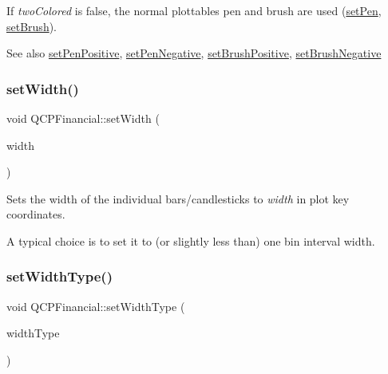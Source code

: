 If {\itshape two\+Colored} is false, the normal plottable\textquotesingle{}s pen and brush are used (\hyperlink{class_q_c_p_abstract_plottable_ab74b09ae4c0e7e13142fe4b5bf46cac7}{set\+Pen}, \hyperlink{class_q_c_p_abstract_plottable_a7a4b92144dca6453a1f0f210e27edc74}{set\+Brush}).

\begin{DoxySeeAlso}{See also}
\hyperlink{class_q_c_p_financial_ac58aa3adc7a35aab0088764b840683e5}{set\+Pen\+Positive}, \hyperlink{class_q_c_p_financial_afe5c07e94ccea01a75b3a2476993c346}{set\+Pen\+Negative}, \hyperlink{class_q_c_p_financial_a5ebff2b1764efd07cc44942e67821829}{set\+Brush\+Positive}, \hyperlink{class_q_c_p_financial_a8bbdd87629f9144b3ef51af660c0961a}{set\+Brush\+Negative} 
\end{DoxySeeAlso}
\mbox{\label{class_q_c_p_financial_a99633f8bac86a61d534ae5eeb1a3068f}} 
\subsubsection{\texorpdfstring{set\+Width()}{setWidth()}}
{\footnotesize\ttfamily void Q\+C\+P\+Financial\+::set\+Width (\begin{DoxyParamCaption}\item[{double}]{width }\end{DoxyParamCaption})}

Sets the width of the individual bars/candlesticks to {\itshape width} in plot key coordinates.

A typical choice is to set it to (or slightly less than) one bin interval width. \mbox{\label{class_q_c_p_financial_a204b7b710352796593a432b723e34089}} 
\subsubsection{\texorpdfstring{set\+Width\+Type()}{setWidthType()}}
{\footnotesize\ttfamily void Q\+C\+P\+Financial\+::set\+Width\+Type (\begin{DoxyParamCaption}\item[{\hyperlink{class_q_c_p_financial_aef1761dda71a53dc5269685e9e492626}{Q\+C\+P\+Financial\+::\+Width\+Type}}]{width\+Type }\end{DoxyParamCaption})}

